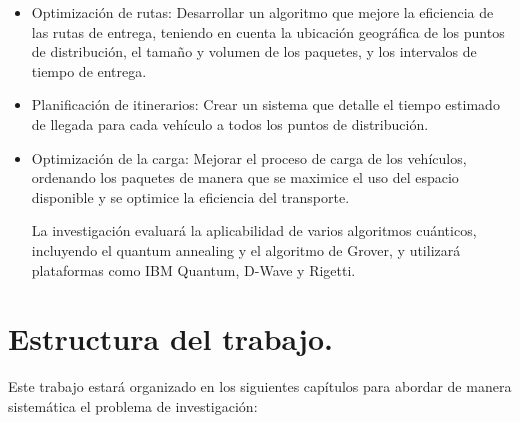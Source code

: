 \documentclass[11pt,a4paper,spanish]{book}
\begin{document}
    \begin{itemize}
    \item Optimización de rutas: Desarrollar un algoritmo que mejore la eficiencia de las rutas de entrega, teniendo en cuenta la ubicación geográfica de los puntos de distribución, el tamaño y volumen de los paquetes, y los intervalos de tiempo de entrega.
    
    \item Planificación de itinerarios: Crear un sistema que detalle el tiempo estimado de llegada para cada vehículo a todos los puntos de distribución.
    
    \item Optimización de la carga: Mejorar el proceso de carga de los vehículos, ordenando los paquetes de manera que se maximice el uso del espacio disponible y se optimice la eficiencia del transporte.
    
    La investigación evaluará la aplicabilidad de varios algoritmos cuánticos, incluyendo el quantum annealing y el algoritmo de Grover, y utilizará plataformas como IBM Quantum, D-Wave y Rigetti.
    \end{itemize}
    
\section{Estructura del trabajo.}

    Este trabajo estará organizado en los siguientes capítulos para abordar de manera sistemática el problema de investigación:
\end{document}
